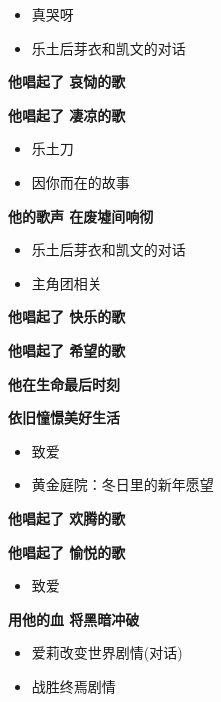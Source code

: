 \documentclass[a4paper]{article}
\begin{document}
\begin{itemize}
    \item 真哭呀
    \item 乐土后芽衣和凯文的对话
\end{itemize}

\textbf{他唱起了 哀恸的歌}

\textbf{他唱起了 凄凉的歌}

\begin{itemize}
    \item 乐土刀
    \item 因你而在的故事
\end{itemize}

\textbf{他的歌声 在废墟间响彻}

\begin{itemize}
    \item 乐土后芽衣和凯文的对话
    \item 主角团相关
\end{itemize}

\textbf{他唱起了 快乐的歌}

\textbf{他唱起了 希望的歌}

\textbf{他在生命最后时刻}

\textbf{依旧憧憬美好生活}

\begin{itemize}
    \item 致爱
    \item 黄金庭院：冬日里的新年愿望
\end{itemize}

\textbf{他唱起了 欢腾的歌}

\textbf{他唱起了 愉悦的歌}

\begin{itemize}
    \item 致爱
\end{itemize}

\textbf{用他的血 将黑暗冲破}

\begin{itemize}
    \item 爱莉改变世界剧情(对话)
    \item 战胜终焉剧情
\end{itemize}
\end{document}
